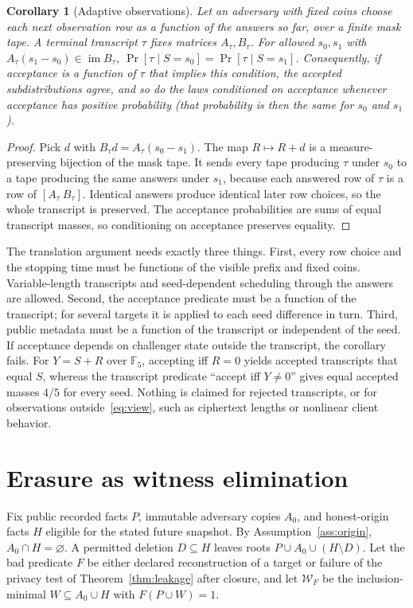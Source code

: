 \documentclass[pdflatex,sn-mathphys-num]{sn-jnl}
\theoremstyle{plain}
\newtheorem{corollary}[theorem]{Corollary}
\theoremstyle{definition}
\newcommand{\F}{\mathbb{F}}
\newcommand{\im}{\operatorname{im}}
\begin{document}
\begin{corollary}[Adaptive observations]\label{cor:adaptive}
Let an adversary with fixed coins choose each next observation row as a function of the answers so far, over a finite mask tape. A terminal transcript $\tau$ fixes matrices $A_\tau,B_\tau$. For allowed $s_0,s_1$ with $A_\tau(s_1-s_0)\in\im B_\tau$, $\Pr[\tau\mid S=s_0]=\Pr[\tau\mid S=s_1]$. Consequently, if acceptance is a function of $\tau$ that implies this condition, the accepted subdistributions agree, and so do the laws conditioned on acceptance whenever acceptance has positive probability (that probability is then the same for $s_0$ and $s_1$).
\end{corollary}
\begin{proof}
Pick $d$ with $B_\tau d=A_\tau(s_0-s_1)$. The map $R\mapsto R+d$ is a measure-preserving bijection of the mask tape. It sends every tape producing $\tau$ under $s_0$ to a tape producing the same answers under $s_1$, because each answered row of $\tau$ is a row of $[A_\tau\ B_\tau]$. Identical answers produce identical later row choices, so the whole transcript is preserved. The acceptance probabilities are sums of equal transcript masses, so conditioning on acceptance preserves equality.
\end{proof}

The translation argument needs exactly three things. First, every row choice and the stopping time must be functions of the visible prefix and fixed coins. Variable-length transcripts and seed-dependent scheduling through the answers are allowed. Second, the acceptance predicate must be a function of the transcript; for several targets it is applied to each seed difference in turn. Third, public metadata must be a function of the transcript or independent of the seed. If acceptance depends on challenger state outside the transcript, the corollary fails. For $Y=S+R$ over $\F_5$, accepting iff $R=0$ yields accepted transcripts that equal $S$, whereas the transcript predicate ``accept iff $Y\neq0$'' gives equal accepted masses $4/5$ for every seed. Nothing is claimed for rejected transcripts, or for observations outside~\eqref{eq:view}, such as ciphertext lengths or nonlinear client behavior.


\section{Erasure as witness elimination}\label{sec:erasure}

Fix public recorded facts $P$, immutable adversary copies $A_0$, and honest-origin facts $H$ eligible for the stated future snapshot. By Assumption~\ref{ass:origin}, $A_0\cap H=\varnothing$. A permitted deletion $D\subseteq H$ leaves roots $P\cup A_0\cup(H\setminus D)$. Let the bad predicate $F$ be either declared reconstruction of a target or failure of the privacy test of Theorem~\ref{thm:leakage} after closure, and let $\mathcal W_F$ be the inclusion-minimal $W\subseteq A_0\cup H$ with $F(P\cup W)=1$.
\end{document}
